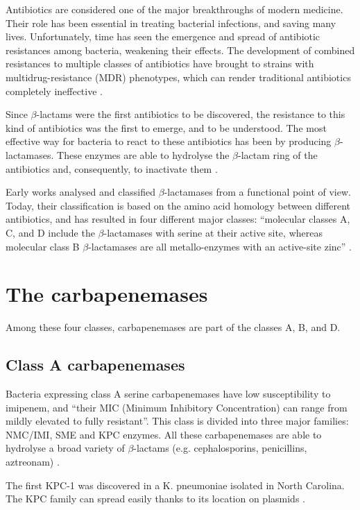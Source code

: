 \documentclass[11pt]{report}
\begin{document}
Antibiotics are considered one of the major breakthroughs of modern medicine. Their role has been essential in treating bacterial infections, and saving many lives. 
Unfortunately, time has seen the emergence and spread of antibiotic resistances among bacteria, weakening their effects. 
The development of combined resistances to multiple classes of antibiotics have brought to strains with multidrug-resistance (MDR) phenotypes, which can render traditional antibiotics completely ineffective \cite{Rossolini2014}.

Since $\beta$-lactams were the first antibiotics to be discovered, the resistance to this kind of antibiotics was the first to emerge, and to be understood. 
The most effective way for bacteria to react to these antibiotics has been by producing $\beta$-lactamases. 
These enzymes are able to hydrolyse the $\beta$-lactam ring of the antibiotics and, consequently, to inactivate them \cite{kong2010beta}.

Early works analysed and classified $\beta$-lactamases from a functional point of view. 
Today, their classification is based on the amino acid homology between different antibiotics, and has resulted in four different major classes: “molecular classes A, C, and D include the $\beta$-lactamases with serine at their active site, whereas molecular class B $\beta$-lactamases are all metallo-enzymes with an active-site zinc” \cite{Queenan2007}.

\section{The carbapenemases}
Among these four classes, carbapenemases are part of the classes A, B, and D.

\subsection{Class A carbapenemases}
Bacteria expressing class A serine carbapenemases have low susceptibility to imipenem, and “their MIC (Minimum Inhibitory Concentration) can range from mildly elevated to fully resistant”. 
This class is divided into three major families: NMC/IMI, SME and KPC enzymes.
All these carbapenemases are able to hydrolyse a broad variety of $\beta$-lactams (e.g. cephalosporins, penicillins, aztreonam) \cite{kong2010beta} \cite{Queenan2007}.

The first KPC-1 was discovered in a K. pneumoniae isolated  in North Carolina. The KPC family can spread easily thanks to its location on plasmids \cite{Queenan2007}.
\end{document}
